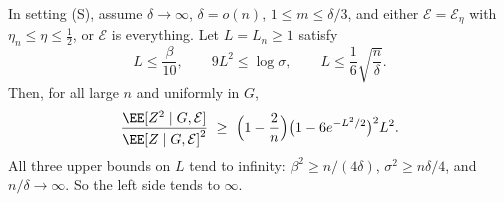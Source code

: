 \begin{theorem}
\label{thm:s3-window-diverges}
In setting (S), assume \(\delta\to\infty\), \(\delta=o(n)\), \(1\le m\le\delta/3\), and either
\(\mathcal E=\mathcal E_\eta\) with \(\eta_n\le\eta\le\tfrac12\), or \(\mathcal E\)
is everything. Let \(L=L_n\ge1\) satisfy
\[
L\le\frac{\beta}{10},\qquad 9L^2\le\log\sigma,\qquad L\le\frac16\sqrt{\frac n\delta}.
\]
Then, for all large \(n\) and uniformly in \(G\),
\[
\frac{\EE[Z^2\mid G,\mathcal E]}{\EE[Z\mid G,\mathcal E]^2}
\ \ge\ \Bigl(1-\frac2n\Bigr)\bigl(1-6e^{-L^2/2}\bigr)^2L^2 .
\]
All three upper bounds on \(L\) tend to infinity: \(\beta^2\ge n/(4\delta)\),
\(\sigma^2\ge n\delta/4\), and \(n/\delta\to\infty\). So the left side tends to \(\infty\).
\end{theorem}

